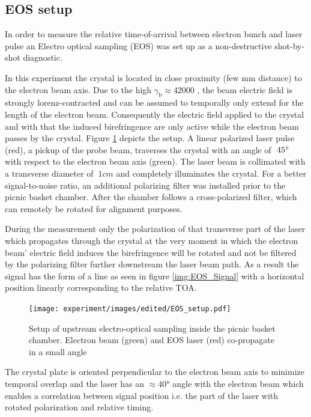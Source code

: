 \subsection*{EOS setup}
In order to measure the relative time-of-arrival between electron bunch and laser pulse an Electro optical sampling (EOS) was set up as a non-destructive shot-by-shot diagnostic.

In this experiment the crystal is located in close proximity (few mm distance) to the electron beam axis. Due to the high $\gamma_\mathrm{b} \approx 42000$ , the beam electric field is strongly lorenz-contracted and can be assumed to temporally only extend for the length of the electron beam. Consequently the electric field applied to the crystal and with that the induced birefringence are only active while the electron beam passes by the crystal.  
Figure \ref{img:EOS_Setup} depicts the setup.
A linear polarized laser pulse (red), a pickup of the probe beam, traverses the crystal with an angle of $~ 45\degree$ with respect to the electron beam axis (green). The laser beam is collimated with a transverse diameter of $~ 1 cm $ and completely illuminates the crystal. For a better signal-to-noise ratio, an additional polarizing filter was installed prior to the picnic basket chamber. After the chamber follows a cross-polarized filter, which can remotely be rotated for alignment purposes.

During the measurement only the polarization of that transverse part of the laser which propagates through the crystal at the very moment in which the electron beam' electric field induces the birefringence will be rotated and not be filtered by the polarizing filter further  downstream the laser beam path. As a result the signal has the form of a line as seen in figure \ref{img:EOS_Signal} with a horizontal position linearly corresponding to the relative TOA.

\begin{figure}[htbp]
\texttt{[image: experiment/images/edited/EOS\_setup.pdf]}
\caption{Setup of upstream electro-optical sampling inside the picnic basket chamber. Electron beam (green) and EOS laser (red) co-propagate in a small angle }
\label{img:EOS_Setup}
\end{figure}

The crystal plate is oriented perpendicular to the electron beam axis to minimize temporal overlap and the laser has an $\approx 40°$ angle with the electron beam which enables a correlation between signal position i.e. the part of the laser with rotated polarization and relative timing.

